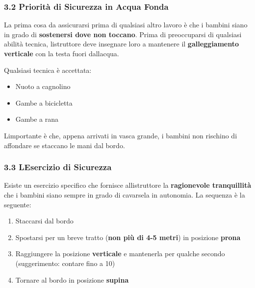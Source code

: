 \documentclass[a4paper,11pt]{article}
\providecommand{\tightlist}{%
  \setlength{\itemsep}{0pt}\setlength{\parskip}{0pt}}
\begin{document}
\subsubsection{3.2 Priorità di Sicurezza in Acqua
      Fonda}\label{priorituxe0-di-sicurezza-in-acqua-fonda}

La prima cosa da assicurarsi prima di qualsiasi altro lavoro è che i
bambini siano in grado di \textbf{sostenersi dove non toccano}. Prima di
preoccuparsi di qualsiasi abilità tecnica, l\textquotesingle istruttore
deve insegnare loro a mantenere il \textbf{galleggiamento verticale} con
la testa fuori dall\textquotesingle acqua.

Qualsiasi tecnica è accettata:

\begin{itemize}
      \tightlist
      \item
            Nuoto a cagnolino
      \item
            Gambe a bicicletta
      \item
            Gambe a rana
\end{itemize}

L\textquotesingle importante è che, appena arrivati in vasca grande, i
bambini non rischino di affondare se staccano le mani dal bordo.

\subsubsection{3.3 L\textquotesingle Esercizio di
      Sicurezza}\label{lesercizio-di-sicurezza}

Esiste un esercizio specifico che fornisce
all\textquotesingle istruttore la \textbf{ragionevole tranquillità} che
i bambini siano sempre in grado di cavarsela in autonomia. La sequenza è
la seguente:

\begin{enumerate}
      \tightlist
      \item
            Staccarsi dal bordo
      \item
            Spostarsi per un breve tratto (\textbf{non più di 4-5 metri}) in
            posizione \textbf{prona}
      \item
            Raggiungere la posizione \textbf{verticale} e mantenerla per qualche
            secondo (suggerimento: contare fino a 10)
      \item
            Tornare al bordo in posizione \textbf{supina}
\end{enumerate}
\end{document}
